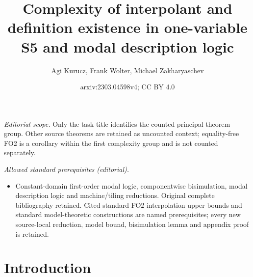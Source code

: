 \documentclass[10pt,a4paper]{amsart}
\title{Complexity of interpolant and definition existence in one-variable S5 and modal description logic}
\author{Agi Kurucz, Frank Wolter, Michael Zakharyaschev}
\date{arxiv:2303.04598v4; CC BY 4.0}
\theoremstyle{plain}
\theoremstyle{definition}
\begin{document}
\maketitle
\noindent\textit{Editorial scope.} Only the task title identifies the counted principal theorem group. Other source theorems are retained as uncounted context; equality-free FO2 is a corollary within the first complexity group and is not counted separately.\par\medskip
\noindent\textit{Allowed standard prerequisites (editorial).}\begin{itemize}
\item Constant-domain first-order modal logic, componentwise bisimulation, modal description logic and machine/tiling reductions. Original complete bibliography retained. Cited standard FO2 interpolation upper bounds and standard model-theoretic constructions are named prerequisites; every new source-local reduction, model bound, bisimulation lemma and appendix proof is retained.
\end{itemize}\medskip
\section{Introduction}\label{intro}
\end{document}
